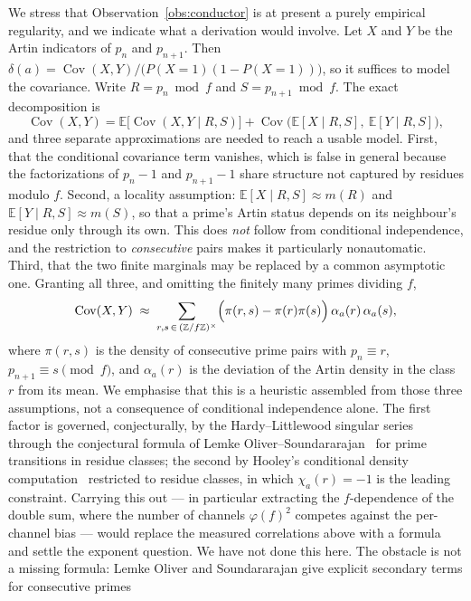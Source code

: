 \documentclass[11pt,reqno]{amsart}
\theoremstyle{plain}
\theoremstyle{definition}
\newcommand{\E}{\mathbb{E}}
\newcommand{\Z}{\mathbb{Z}}
\begin{document}
We stress that Observation~\ref{obs:conductor} is at present a purely empirical
regularity, and we indicate what a derivation would involve. Let $X$ and $Y$
be the Artin indicators of $p_n$ and $p_{n+1}$. Then
$\delta(a) = \operatorname{Cov}(X, Y) / \bigl(P(X=1)(1 - P(X=1))\bigr)$, so it
suffices to model the covariance. Write $R = p_n \bmod f$ and $S = p_{n+1} \bmod f$. The exact decomposition is
\[
  \operatorname{Cov}(X, Y)
   = \E\bigl[\operatorname{Cov}(X, Y \mid R, S)\bigr]
   + \operatorname{Cov}\bigl(\E[X \mid R, S],\ \E[Y \mid R, S]\bigr),
\]
and three separate approximations are needed to reach a usable model. First,
that the conditional covariance term vanishes, which is false in general
because the factorizations of $p_n - 1$ and $p_{n+1} - 1$ share structure not
captured by residues modulo $f$. Second, a locality assumption:
$\E[X \mid R, S] \approx m(R)$ and $\E[Y \mid R, S] \approx m(S)$, so that a
prime's Artin status depends on its neighbour's residue only through its own.
This does \emph{not} follow from conditional independence, and the restriction
to \emph{consecutive} pairs makes it particularly nonautomatic. Third, that
the two finite marginals may be replaced by a common asymptotic one. Granting
all three, and omitting the finitely many primes dividing $f$,
\[
  \operatorname{Cov}(X, Y) \;\approx\; \sum_{r, s \,\in\, (\Z/f\Z)^\times}
     \Bigl( \pi(r, s) - \pi(r)\pi(s) \Bigr)\,
     \alpha_a(r)\,\alpha_a(s),
\]
where $\pi(r, s)$ is the density of consecutive prime pairs with
$p_n \equiv r$, $p_{n+1} \equiv s \pmod f$, and $\alpha_a(r)$ is the deviation
of the Artin density in the class $r$ from its mean. We emphasise that this is
a heuristic assembled from those three assumptions, not a consequence of
conditional independence alone. The first factor is
governed, conjecturally, by the Hardy--Littlewood singular
series~\cite{HardyLittlewood1923} through the conjectural formula of Lemke
Oliver--Soundararajan~\cite[Conj.~1.1]{LOS2016} for prime transitions in
residue classes; the second by Hooley's conditional density
computation~\cite{Hooley1967} restricted to residue classes, in which
$\chi_a(r) = -1$ is the leading constraint. Carrying this out --- in particular
extracting the $f$-dependence of the double sum, where the number of channels
$\varphi(f)^2$ competes against the per-channel bias --- would replace the
measured correlations above with a formula and settle the exponent question.
We have not done this here. The obstacle is not a missing formula: Lemke
Oliver and Soundararajan give explicit secondary terms for consecutive primes
\end{document}
